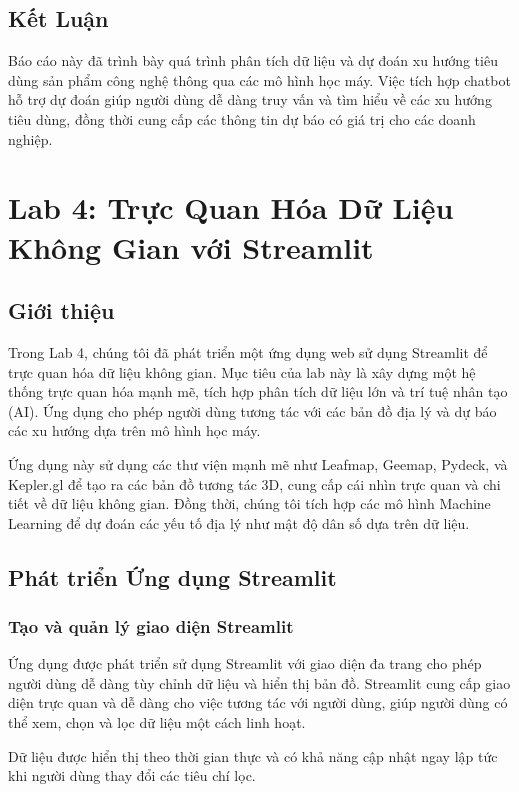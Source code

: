 \documentclass[a4paper,12pt]{report}
\begin{document}
\section{Kết Luận}
Báo cáo này đã trình bày quá trình phân tích dữ liệu và dự đoán xu hướng tiêu dùng sản phẩm công nghệ thông qua các mô hình học máy. Việc tích hợp chatbot hỗ trợ dự đoán giúp người dùng dễ dàng truy vấn và tìm hiểu về các xu hướng tiêu dùng, đồng thời cung cấp các thông tin dự báo có giá trị cho các doanh nghiệp.


\chapter{Lab 4: Trực Quan Hóa Dữ Liệu Không Gian với Streamlit}

\section{Giới thiệu}
Trong Lab 4, chúng tôi đã phát triển một ứng dụng web sử dụng Streamlit để trực quan hóa dữ liệu không gian. Mục tiêu của lab này là xây dựng một hệ thống trực quan hóa mạnh mẽ, tích hợp phân tích dữ liệu lớn và trí tuệ nhân tạo (AI). Ứng dụng cho phép người dùng tương tác với các bản đồ địa lý và dự báo các xu hướng dựa trên mô hình học máy.

Ứng dụng này sử dụng các thư viện mạnh mẽ như Leafmap, Geemap, Pydeck, và Kepler.gl để tạo ra các bản đồ tương tác 3D, cung cấp cái nhìn trực quan và chi tiết về dữ liệu không gian. Đồng thời, chúng tôi tích hợp các mô hình Machine Learning để dự đoán các yếu tố địa lý như mật độ dân số dựa trên dữ liệu.

\section{Phát triển Ứng dụng Streamlit}
\subsection{Tạo và quản lý giao diện Streamlit}
Ứng dụng được phát triển sử dụng Streamlit với giao diện đa trang cho phép người dùng dễ dàng tùy chỉnh dữ liệu và hiển thị bản đồ. Streamlit cung cấp giao diện trực quan và dễ dàng cho việc tương tác với người dùng, giúp người dùng có thể xem, chọn và lọc dữ liệu một cách linh hoạt.

Dữ liệu được hiển thị theo thời gian thực và có khả năng cập nhật ngay lập tức khi người dùng thay đổi các tiêu chí lọc.
\end{document}

